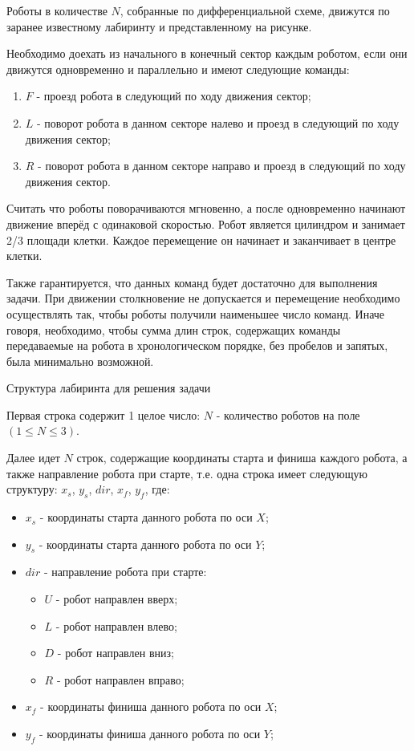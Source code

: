 
Роботы в количестве $N$, собранные по дифференциальной схеме, движутся по заранее известному лабиринту и
представленному на рисунке.

Необходимо доехать из начального в конечный сектор каждым роботом, если они движутся одновременно и параллельно и имеют следующие команды:

\begin{enumerate}
    \item $F$ - проезд робота в следующий по ходу движения сектор;
    \item $L$ - поворот робота в данном секторе налево и проезд в следующий по ходу движения сектор;
    \item $R$ - поворот робота в данном секторе направо и проезд в следующий по ходу движения сектор.
\end{enumerate}

Считать что роботы поворачиваются мгновенно, а после одновременно начинают движение вперёд с одинаковой скоростью. Робот является цилиндром и занимает 2/3 площади клетки. Каждое перемещение он начинает и заканчивает в центре клетки.  

Также гарантируется, что данных команд будет достаточно для выполнения задачи. При движении столкновение не допускается и перемещение необходимо осуществлять так, чтобы роботы получили наименьшее число команд. Иначе говоря, необходимо, чтобы сумма длин строк, содержащих команды передаваемые на робота в хронологическом порядке, без пробелов и запятых, была минимально возможной.


Структура лабиринта для решения задачи


Первая строка содержит 1 целое число: $N$ - количество роботов на поле $(1 \leq N \leq 3)$.

Далее идет $N$ строк, содержащие координаты старта и финиша каждого робота, а также направление робота при старте, т.е. одна строка имеет следующую структуру: $x_s$, $y_s$, $dir$, $x_f$, $y_f$, где:

\begin{itemize}
    \item $x_s$ - координаты старта данного робота по оси $X$;
    \item $y_s$ - координаты старта данного робота по оси $Y$;
    \item $dir$ - направление робота при старте:
    \begin{itemize}
        \item $U$ - робот направлен вверх;
        \item $L$ - робот направлен влево;
        \item $D$ - робот направлен вниз;
        \item $R$ - робот направлен вправо;
    \end{itemize}
    \item $x_f$ - координаты финиша данного робота по оси $X$;
    \item $y_f$ - координаты финиша данного робота по оси $Y$;
\end{itemize}

